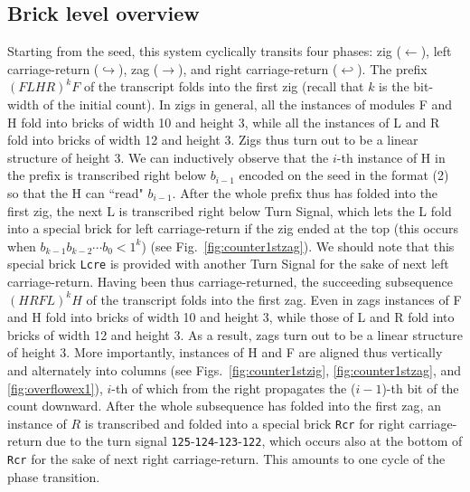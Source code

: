 \documentclass[twocolumn]{svjour3}
\begin{document}
\subsection{Brick level overview}
Starting from the seed, this system cyclically transits four phases: zig ($\leftarrow$), left carriage-return ($\hookrightarrow$), zag ($\rightarrow$), and right carriage-return ($\hookleftarrow$). 
The prefix $(FLHR)^k F$ of the transcript folds into the first zig (recall that $k$ is the bit-width of the initial count). 
In zigs in general, all the instances of modules F and H fold into bricks of width 10 and height 3, while all the instances of  L and R fold into bricks of width 12 and height 3. 
Zigs thus turn out to be a linear structure of height 3. 
We can inductively observe that the $i$-th instance of H in the prefix is transcribed right below $b_{i-1}$ encoded on the seed in the format (2) so that the H can ``read" $b_{i-1}$. 
After the whole prefix thus has folded into the first zig, the next L is transcribed right below Turn Signal, which lets the L fold into a special brick for left carriage-return if the zig ended at the top (this occurs when $b_{k-1} b_{k-2} \cdots b_0 < 1^k$) (see Fig.~\ref{fig:counter1stzag}). 
We should note that this special brick \texttt{Lcre} is provided with another Turn Signal for the sake of next left carriage-return.
Having been thus carriage-returned, the succeeding subsequence $(HRFL)^k H$ of the transcript folds into the first zag.
Even in zags instances of F and H fold into bricks of width 10 and height 3, while those of L and R fold into bricks of width 12 and height 3. 
As a result, zags turn out to be a linear structure of height 3. 
More importantly, instances of H and F are aligned thus vertically and alternately into columns (see Figs.~\ref{fig:counter1stzig}, \ref{fig:counter1stzag}, and \ref{fig:overflowex1}), $i$-th of which from the right propagates the ($i{-}1$)-th bit of the count downward. 
After the whole subsequence has folded into the first zag, an instance of $R$ is transcribed and folded into a special brick \texttt{Rcr} for right carriage-return due to the turn signal \texttt{125}-\texttt{124}-\texttt{123}-\texttt{122}, which occurs also at the bottom of \texttt{Rcr} for the sake of next right carriage-return. 
This amounts to one cycle of the phase transition.
 
\end{document}
